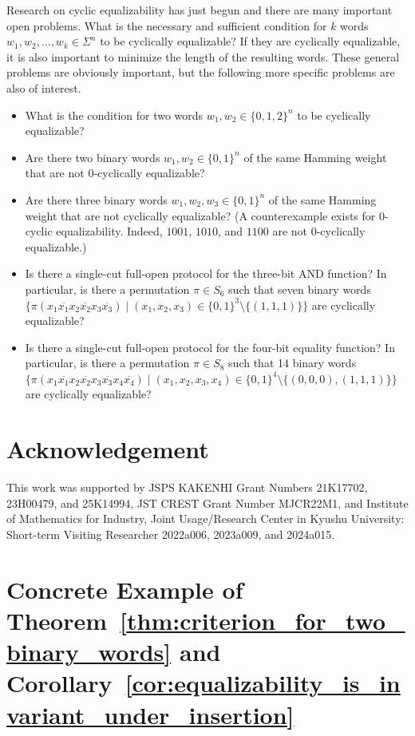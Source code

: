 \documentclass{article}
\theoremstyle{definition}
\newcommand{\bin}{\{0,1\}}
\newcommand{\ol}[1]{\overline{#1}}
\begin{document}
Research on cyclic equalizability has just begun and there are many important open problems. 
What is the necessary and sufficient condition for $k$ words $w_1, w_2, \ldots, w_k \in \Sigma^n$ to be cyclically equalizable?
If they are cyclically equalizable, it is also important to minimize the length of the resulting words. 
These general problems are obviously important, but the following more specific problems are also of interest.
\begin{itemize}
\item What is the condition for two words $w_1, w_2 \in \{0,1,2\}^n$ to be cyclically equalizable?
\item Are there two binary words $w_1, w_2 \in \bin^n$ of the same Hamming weight that are not $0$-cyclically equalizable?
\item Are there three binary words $w_1, w_2, w_3 \in \bin^n$ of the same Hamming weight that are not cyclically equalizable? (A counterexample exists for $0$-cyclic equalizability.
Indeed, $1001$, $1010$, and $1100$ are not $0$-cyclically equalizable.)
\item Is there a single-cut full-open protocol for the three-bit AND function? In particular, is there a permutation $\pi \in S_{6}$ such that seven binary words $\{\pi(x_1\ol{x_1}x_2\ol{x_2}x_3\ol{x_3}) \mid (x_1,x_2,x_3) \in \bin^3\setminus \{(1,1,1)\}\}$ are cyclically equalizable?
\item Is there a single-cut full-open protocol for the four-bit equality function? In particular, is there a permutation $\pi \in S_{8}$ such that 14 binary words $\{\pi(x_1\ol{x_1}x_2\ol{x_2}x_3\ol{x_3}x_4\ol{x_4}) \mid (x_1,x_2,x_3,x_4) \in \bin^4\setminus \{(0,0,0), (1,1,1)\}\}$ are cyclically equalizable?
\end{itemize}

\section*{Acknowledgement}

This work was supported by JSPS KAKENHI Grant Numbers 21K17702, 23H00479, and 25K14994, JST CREST Grant Number MJCR22M1, and Institute of Mathematics for Industry, Joint Usage/Research Center in Kyushu University: Short-term Visiting Researcher 2022a006, 2023a009, and 2024a015.




\appendix

\section{Concrete Example of Theorem~\ref{thm:criterion_for_two_binary_words} and Corollary~\ref{cor:equalizability_is_invariant_under_insertion}}
\end{document}
